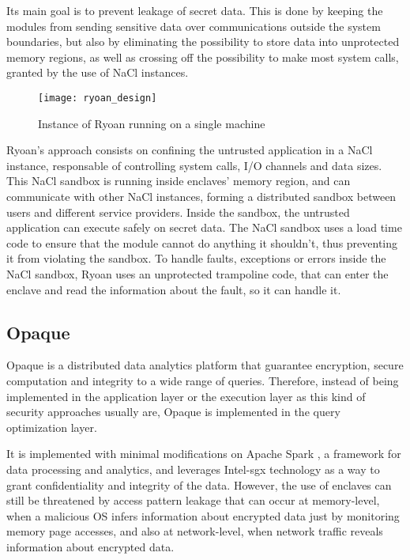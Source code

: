 Its main goal is to prevent leakage of secret data. This is done by keeping the modules from sending sensitive data over communications outside the system boundaries, but also by eliminating the possibility to store data into unprotected memory regions, as well as crossing off the possibility to make most system calls, granted by the use of NaCl instances. 


\begin{figure}[htbp]
	\centering
	{\texttt{[image: ryoan\_design]}}%
	\caption{Instance of Ryoan running on a single machine}
\end{figure}

Ryoan's approach consists on confining the untrusted application in a NaCl instance, responsable of controlling system calls, I/O channels and data sizes. This NaCl sandbox is running inside enclaves' memory region, and can communicate with other NaCl instances, forming a distributed sandbox between users and different service providers. Inside the sandbox, the untrusted application can execute safely on secret data. The NaCl sandbox uses a load time code to ensure that the module cannot do anything it shouldn't, thus preventing it from violating the sandbox. To handle faults, exceptions or errors inside the NaCl sandbox, Ryoan uses an unprotected trampoline code, that can enter the enclave and read the information about the fault, so it can handle it.
\subsection{Opaque}
\label{ssec:opaque}

Opaque \cite{opaquePaper} is a distributed data analytics platform that guarantee encryption, secure computation and integrity to a wide range of queries. Therefore, instead of being implemented in the application layer or the execution layer as this kind of security approaches usually are, Opaque is implemented in the query optimization layer. 

It is implemented with minimal modifications on Apache Spark \cite{apacheSparkPaper}, a framework for data processing and analytics, and leverages Intel-\gls{sgx} technology as a way to grant confidentiality and integrity of the data. 
However, the use of enclaves can still be threatened by access pattern leakage that can occur at memory-level, when a malicious OS infers information about encrypted data just by monitoring memory page accesses, and also at network-level, when network traffic reveals information about encrypted data.

